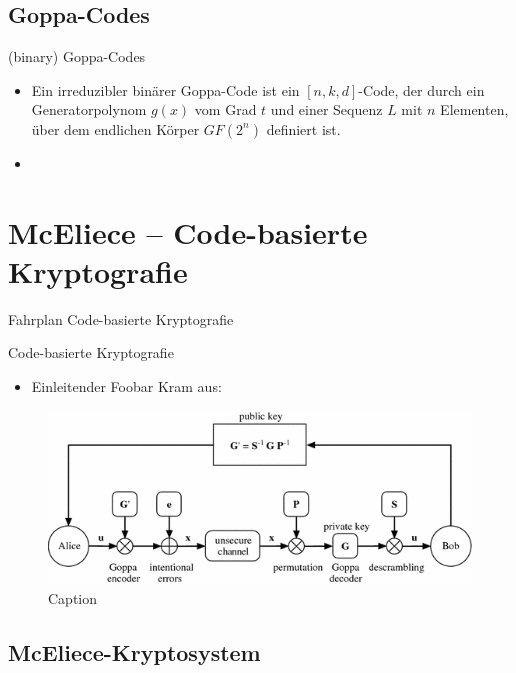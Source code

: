 \documentclass[11pt%
,aspectratio=169%
]{beamer}
\begin{document}
\subsection{Goppa-Codes}

\begin{frame}{(binary) Goppa-Codes}
	\begin{itemize}
		\item Ein irreduzibler binärer Goppa-Code ist ein $[n,k,d]$-Code, der durch ein Generatorpolynom $g(x)$ vom Grad $t$ und einer Sequenz $L$ mit $n$ Elementen, über dem endlichen Körper $GF(2^n)$ definiert ist. 
		\item 
	\end{itemize}
\end{frame}

\section{McEliece -- Code-basierte Kryptografie}

\begin{frame}{Fahrplan Code-basierte Kryptografie}
\end{frame}

\begin{frame}{Code-basierte Kryptografie}
	\begin{itemize}
		\item Einleitender Foobar Kram aus: \cite{Stinson2018Cryptography}
	\end{itemize}
	\begin{figure}
	    \centering
	    \includegraphics[scale=0.6]{pictures/mceliece.png}
	    \caption{Caption}
	    \label{fig:mceliece_overvie }
	\end{figure}
\end{frame}

\subsection{McEliece-Kryptosystem}
\end{document}
